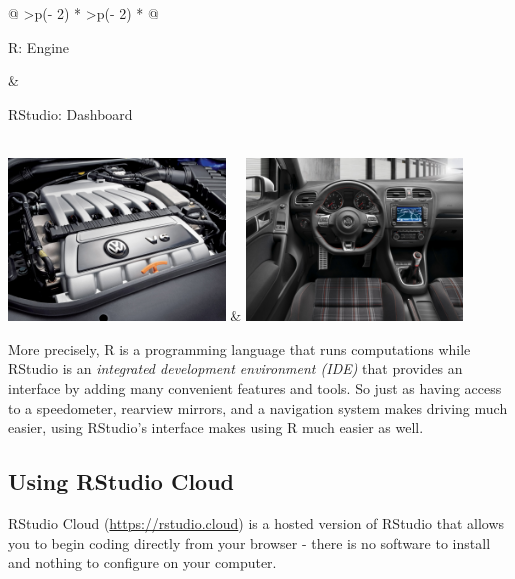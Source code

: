 \documentclass[
  letterpaper,
  DIV=11,
  numbers=noendperiod]{scrreprt}
\theoremstyle{definition}
\theoremstyle{remark}
\begin{document}
\begin{longtable}[]{@{}
  >{\centering\arraybackslash}p{(\columnwidth - 2\tabcolsep) * }
  >{\centering\arraybackslash}p{(\columnwidth - 2\tabcolsep) * }@{}}
\toprule\noalign{}
\begin{minipage}[b]{\linewidth}\centering
R: Engine
\end{minipage} & \begin{minipage}[b]{\linewidth}\centering
RStudio: Dashboard
\end{minipage} \\
\midrule\noalign{}
\endhead
\bottomrule\noalign{}
\endlastfoot
\includegraphics[width=\textwidth,height=1.7in]{images/engine.jpg} &
\includegraphics[width=\textwidth,height=1.7in]{images/dashboard.jpg} \\
\end{longtable}

More precisely, R is a programming language that runs computations while
RStudio is an \emph{integrated development environment (IDE)} that
provides an interface by adding many convenient features and tools. So
just as having access to a speedometer, rearview mirrors, and a
navigation system makes driving much easier, using RStudio's interface
makes using R much easier as well.

\hypertarget{using-rstudio-cloud}{%
\subsection{Using RStudio Cloud}\label{using-rstudio-cloud}}

RStudio Cloud (\url{https://rstudio.cloud}) is a hosted version of
RStudio that allows you to begin coding directly from your browser -
there is no software to install and nothing to configure on your
computer.
\end{document}
